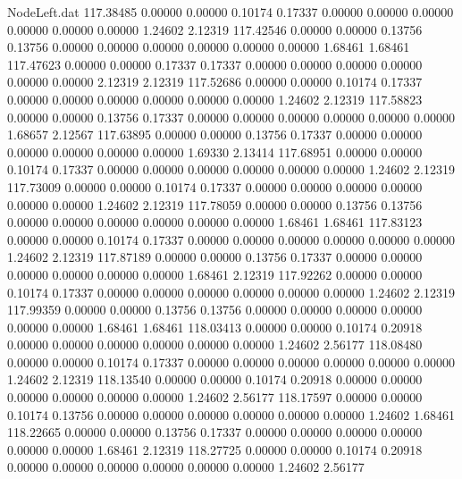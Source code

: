 \begin{filecontents}{NodeLeft.dat}
 117.38485    0.00000    0.00000     0.10174    0.17337    0.00000    0.00000    0.00000    0.00000    0.00000    0.00000    1.24602    2.12319
 117.42546    0.00000    0.00000     0.13756    0.13756    0.00000    0.00000    0.00000    0.00000    0.00000    0.00000    1.68461    1.68461
 117.47623    0.00000    0.00000     0.17337    0.17337    0.00000    0.00000    0.00000    0.00000    0.00000    0.00000    2.12319    2.12319
 117.52686    0.00000    0.00000     0.10174    0.17337    0.00000    0.00000    0.00000    0.00000    0.00000    0.00000    1.24602    2.12319
 117.58823    0.00000    0.00000     0.13756    0.17337    0.00000    0.00000    0.00000    0.00000    0.00000    0.00000    1.68657    2.12567
 117.63895    0.00000    0.00000     0.13756    0.17337    0.00000    0.00000    0.00000    0.00000    0.00000    0.00000    1.69330    2.13414
 117.68951    0.00000    0.00000     0.10174    0.17337    0.00000    0.00000    0.00000    0.00000    0.00000    0.00000    1.24602    2.12319
 117.73009    0.00000    0.00000     0.10174    0.17337    0.00000    0.00000    0.00000    0.00000    0.00000    0.00000    1.24602    2.12319
 117.78059    0.00000    0.00000     0.13756    0.13756    0.00000    0.00000    0.00000    0.00000    0.00000    0.00000    1.68461    1.68461
 117.83123    0.00000    0.00000     0.10174    0.17337    0.00000    0.00000    0.00000    0.00000    0.00000    0.00000    1.24602    2.12319
 117.87189    0.00000    0.00000     0.13756    0.17337    0.00000    0.00000    0.00000    0.00000    0.00000    0.00000    1.68461    2.12319
 117.92262    0.00000    0.00000     0.10174    0.17337    0.00000    0.00000    0.00000    0.00000    0.00000    0.00000    1.24602    2.12319
 117.99359    0.00000    0.00000     0.13756    0.13756    0.00000    0.00000    0.00000    0.00000    0.00000    0.00000    1.68461    1.68461
 118.03413    0.00000    0.00000     0.10174    0.20918    0.00000    0.00000    0.00000    0.00000    0.00000    0.00000    1.24602    2.56177
 118.08480    0.00000    0.00000     0.10174    0.17337    0.00000    0.00000    0.00000    0.00000    0.00000    0.00000    1.24602    2.12319
 118.13540    0.00000    0.00000     0.10174    0.20918    0.00000    0.00000    0.00000    0.00000    0.00000    0.00000    1.24602    2.56177
 118.17597    0.00000    0.00000     0.10174    0.13756    0.00000    0.00000    0.00000    0.00000    0.00000    0.00000    1.24602    1.68461
 118.22665    0.00000    0.00000     0.13756    0.17337    0.00000    0.00000    0.00000    0.00000    0.00000    0.00000    1.68461    2.12319
 118.27725    0.00000    0.00000     0.10174    0.20918    0.00000    0.00000    0.00000    0.00000    0.00000    0.00000    1.24602    2.56177

\end{filecontents}
